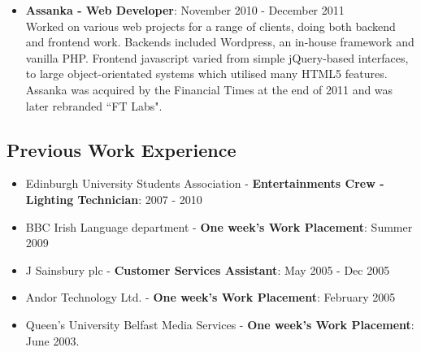 \documentclass[a4paper]{article}
\begin{document}
\begin{itemize}
\item {\bf Assanka - Web Developer}: November 2010 - December 2011\\
Worked on various web projects for a range of clients, doing both backend and frontend work. Backends included Wordpress, an in-house framework and vanilla PHP. Frontend javascript varied from simple jQuery-based interfaces, to large object-orientated systems which utilised many HTML5 features.
Assanka was acquired by the Financial Times at the end of 2011 and was later rebranded ``FT Labs".
\end{itemize}

\subsection*{Previous Work Experience}
\begin{itemize}

\item Edinburgh University Students Association - {\bf Entertainments Crew - Lighting Technician}: 2007 - 2010
\item BBC Irish Language department - {\bf One week's Work Placement}: Summer 2009
\item J Sainsbury plc - {\bf Customer Services Assistant}: May 2005 - Dec 2005
\item Andor Technology Ltd. - {\bf One week's Work Placement}:  February 2005
\item Queen's University Belfast Media Services - {\bf One week's Work Placement}:  June 2003.


\end{itemize}
\end{document}

